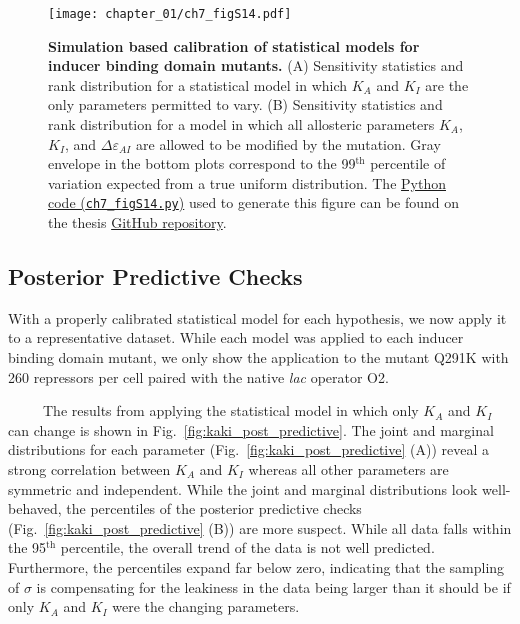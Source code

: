 \documentclass[12pt]{caltech_thesis}
\begin{document}
\hypertarget{fig:ind_sbc}{%
\begin{figure}
\centering
\texttt{[image: chapter\_01/ch7\_figS14.pdf]}
\caption[{Simulation based calibration of statistical models for inducer
binding domain mutants.}]{\textbf{Simulation based calibration of
statistical models for inducer binding domain mutants.} (A) Sensitivity
statistics and rank distribution for a statistical model in which
\(K_A\) and \(K_I\) are the only parameters permitted to vary. (B)
Sensitivity statistics and rank distribution for a model in which all
allosteric parameters \(K_A\), \(K_I\), and \(\Delta\varepsilon_{AI}\)
are allowed to be modified by the mutation. Gray envelope in the bottom
plots correspond to the 99\(^\text{th}\) percentile of variation
expected from a true uniform distribution. The
\href{https://github.com/gchure/phd/blob/master/src/chapter_07/code/ch7_figS14.py}{Python
code (\texttt{ch7\_figS14.py})} used to generate this figure can be
found on the thesis \href{https://github.com/gchure/phd}{GitHub
repository}.}
\label{fig:ind_sbc}
\end{figure}
}

\hypertarget{posterior-predictive-checks-1}{%
\subsection{Posterior Predictive
Checks}\label{posterior-predictive-checks-1}}

With a properly calibrated statistical model for each hypothesis, we now
apply it to a representative dataset. While each model was applied to
each inducer binding domain mutant, we only show the application to the
mutant Q291K with 260 repressors per cell paired with the native
\emph{lac} operator O2.

~~~~~The results from applying the statistical model in which only
\(K_A\) and \(K_I\) can change is shown in
Fig.~\ref{fig:kaki_post_predictive}. The joint and marginal
distributions for each parameter (Fig.~\ref{fig:kaki_post_predictive}
(A)) reveal a strong correlation between \(K_A\) and \(K_I\) whereas all
other parameters are symmetric and independent. While the joint and
marginal distributions look well-behaved, the percentiles of the
posterior predictive checks (Fig.~\ref{fig:kaki_post_predictive} (B))
are more suspect. While all data falls within the 95\(^\text{th}\)
percentile, the overall trend of the data is not well predicted.
Furthermore, the percentiles expand far below zero, indicating that the
sampling of \(\sigma\) is compensating for the leakiness in the data
being larger than it should be if only \(K_A\) and \(K_I\) were the
changing parameters.
\end{document}
